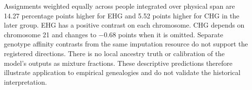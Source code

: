 \documentclass[letterpaper]{article}
\begin{document}
Assignments weighted equally across people integrated over physical span are 14.27 percentage points higher for EHG and 5.52 points higher for CHG in the later group. EHG has a positive contrast on each chromosome. CHG depends on chromosome 21 and changes to $-0.68$ points when it is omitted. Separate genotype affinity contrasts from the same imputation resource do not support the registered directions. There is no local ancestry truth or calibration of the model's outputs as mixture fractions. These descriptive predictions therefore illustrate application to empirical genealogies and do not validate the historical interpretation.
\end{document}
